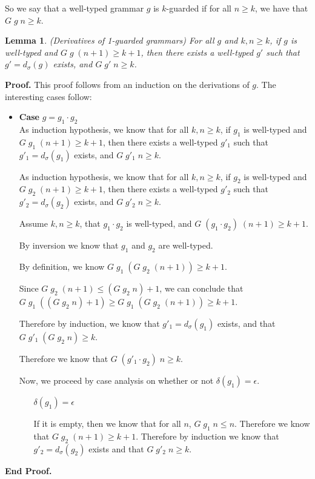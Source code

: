 \documentclass{article}
\newcommand{\deriv}[2]{d_{#1}({#2})}
\newcommand{\emptify}[1]{\delta({#1})}
\newtheorem{lemma}{Lemma}
\newenvironment{proof}{\noindent\textbf{Proof.}}
{\noindent\textbf{End Proof.}}
\newenvironment{caseblock}{\begin{itemize}}{\end{itemize}}
\newenvironment{case}[1]{\item \textbf{Case} {#1}\\}{}
\begin{document}
So we say that a well-typed grammar $g$ is $k$-guarded if for all $n
\geq k$, we have that $G\;g\;n \geq k$. 

\begin{lemma}{(Derivatives of 1-guarded grammars)}
  For all $g$ and $k, n \geq k$, if $g$ is well-typed and $G\;g\;(n+1) \geq k+1$,
  then there exists a well-typed $g'$ such that $g' =
  \deriv{\sigma}{g}$ exists, and $G\;g'\;n \geq k$.
\end{lemma}

\begin{proof}
  This proof follows from an induction on the derivations of $g$. The interesting cases follow: 
  \begin{caseblock}
    \begin{case}{$g = g_1\cdot g_2$}
      As induction hypothesis, we know that for all $k, n \geq
      k$, if $g_1$ is well-typed and $G\;g_1\;(n+1) \geq k+1$, then there
      exists a well-typed $g'_1$ such that $g'_1 = \deriv{\sigma}{g_1}$
      exists, and $G\;g'_1\;n \geq k$.

      As induction hypothesis, we know that for all $k, n \geq
      k$, if $g_2$ is well-typed and $G\;g_2\;(n+1) \geq k+1$, then there
      exists a well-typed $g'_2$ such that $g'_2 = \deriv{\sigma}{g_2}$
      exists, and $G\;g'_2\;n \geq k$.
      
      Assume $k, n \geq k$, that $g_1\cdot g_2$ is well-typed, and $G\;(g_1\cdot g_2)\;(n+1) \geq k+1$. 
      
      By inversion we know that $g_1$ and $g_2$ are well-typed. 
      
      By definition, we know $G\;g_1\;(G\;g_2\;(n+1)) \geq k+1$. 

      Since $G\;g_2\;(n+1) \leq (G\;g_2\;n)+1$, we can conclude
      that $G\;g_1\;((G\;g_2\;n)+1) \geq G\;g_1\;(G\;g_2\;(n+1)) \geq k+1$. 

      Therefore by induction, we know that $g'_1 = \deriv{\sigma}{g_1}$ exists,
      and that $G\;g'_1\;(G\;g_2\;n) \geq k$. 

      Therefore we know that $G\;(g'_1\cdot g_2)\;n \geq k$. 

      Now, we proceed by case analysis on whether or not $\emptify{g_1} = \epsilon$. 

      \begin{itemize}
        \item[$\emptify{g_1} = \epsilon$]
          
          If it is empty, then we know that for all $n$, $G\;g_1\; n
          \leq n$. Therefore we know that $G\;g_2\;(n+1) \geq
          k+1$. Therefore by induction we know that $g'_2 =
          \deriv{\sigma}{g_2}$ exists and that $G\;g'_2\;n \geq k$.


\end{itemize}
\end{case}
\end{caseblock}
\end{proof}
\end{document}
